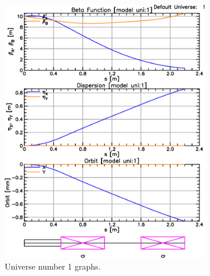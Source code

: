 \documentclass{hitec}     %
\begin{document}
\begin{figure}[tb]
  \centering
  \begin{subfigure}[t]{0.49\textwidth}
    \includegraphics[width=\textwidth]{uni1.pdf}
    \caption{Universe number 1 graphs.}
    \label{f:uni1}
  \end{subfigure}
  \hfil
  \begin{subfigure}[t]{0.49\textwidth}

\end{subfigure}
\end{figure}
\end{document}
